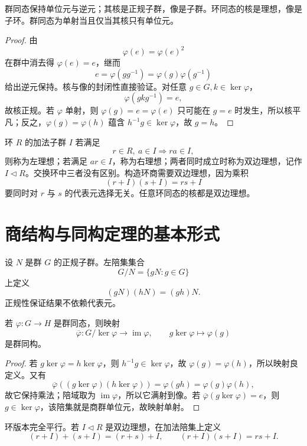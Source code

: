 \begin{proposition}
群同态保持单位元与逆元；其核是正规子群，像是子群。环同态的核是理想，像是子环。群同态为单射当且仅当其核只有单位元。
\end{proposition}

\begin{proof}
由
\[
 \varphi(e)=\varphi(e)^2
\]
在群中消去得 \(\varphi(e)=e\)，继而
\[
 e=\varphi(gg^{-1})=\varphi(g)\varphi(g^{-1})
\]
给出逆元保持。核与像的封闭性直接验证。对任意 \(g\in G,k\in\ker\varphi\)，
\[
 \varphi(gkg^{-1})=e,
\]
故核正规。若 \(\varphi\) 单射，则 \(\varphi(g)=e=\varphi(e)\) 只可能在 \(g=e\) 时发生，所以核平凡；反之，\(\varphi(g)=\varphi(h)\) 蕴含 \(h^{-1}g\in\ker\varphi\)，故 \(g=h\)。
\end{proof}

\begin{definition}
环 \(R\) 的加法子群 \(I\) 若满足
\[
 r\in R,\ a\in I\Longrightarrow ra\in I,
\]
则称为左理想；若满足 \(ar\in I\)，称为右理想；两者同时成立时称为双边理想，记作 \(I\lhd R\)。交换环中三者没有区别。构造环商需要双边理想，因为乘积
\[
 (r+I)(s+I)=rs+I
\]
要同时对 \(r\) 与 \(s\) 的代表元选择无关。任意环同态的核都是双边理想。
\end{definition}

\section{商结构与同构定理的基本形式}

设 \(N\) 是群 \(G\) 的正规子群。左陪集集合
\[
 G/N=\{gN:g\in G\}
\]
上定义
\[
 (gN)(hN)=(gh)N.
\]
正规性保证结果不依赖代表元。

\begin{theorem}[群的第一同构定理]
若 \(\varphi:G\to H\) 是群同态，则映射
\[
 \overline\varphi:G/\ker\varphi\to\operatorname{im}\varphi,\qquad
 g\ker\varphi\longmapsto\varphi(g)
\]
是群同构。
\end{theorem}

\begin{proof}
若 \(g\ker\varphi=h\ker\varphi\)，则 \(h^{-1}g\in\ker\varphi\)，故 \(\varphi(g)=\varphi(h)\)，所以映射良定义。又有
\[
 \overline\varphi((g\ker\varphi)(h\ker\varphi))
 =\varphi(gh)=\varphi(g)\varphi(h),
\]
故它保持乘法；陪域取为 \(\operatorname{im}\varphi\)，所以它满射到像。若 \(\overline\varphi(g\ker\varphi)=e\)，则 \(g\in\ker\varphi\)，该陪集就是商群单位元，故映射单射。
\end{proof}

环版本完全平行。若 \(I\lhd R\) 是双边理想，在加法陪集上定义
\[
 (r+I)+(s+I)=(r+s)+I,\qquad
 (r+I)(s+I)=rs+I.
\]

